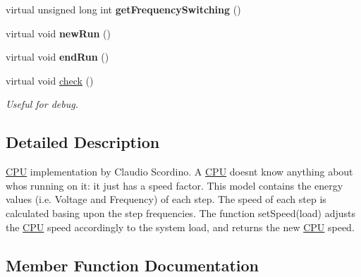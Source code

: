 \begin{DoxyCompactItemize}
\item 
virtual unsigned long int {\bfseries get\+Frequency\+Switching} ()\hypertarget{classRTSim_1_1CPU_a783104c122067f0a14127e64bbaf0a58}{}\label{classRTSim_1_1CPU_a783104c122067f0a14127e64bbaf0a58}

\item 
virtual void {\bfseries new\+Run} ()\hypertarget{classRTSim_1_1CPU_a478cf472c9d9b5cd8daf12e1b0a09893}{}\label{classRTSim_1_1CPU_a478cf472c9d9b5cd8daf12e1b0a09893}

\item 
virtual void {\bfseries end\+Run} ()\hypertarget{classRTSim_1_1CPU_a53b0e66fc9c8b288a31b1c4eab5e28ed}{}\label{classRTSim_1_1CPU_a53b0e66fc9c8b288a31b1c4eab5e28ed}

\item 
virtual void \hyperlink{classRTSim_1_1CPU_a4b80bedc04b5162e7788dd4003aa5175}{check} ()\hypertarget{classRTSim_1_1CPU_a4b80bedc04b5162e7788dd4003aa5175}{}\label{classRTSim_1_1CPU_a4b80bedc04b5162e7788dd4003aa5175}

\begin{DoxyCompactList}\small\item\em Useful for debug. \end{DoxyCompactList}\end{DoxyCompactItemize}


\subsection{Detailed Description}
\hyperlink{classRTSim_1_1CPU}{C\+PU} implementation by Claudio Scordino. A \hyperlink{classRTSim_1_1CPU}{C\+PU} doesn\textquotesingle{}t know anything about who\textquotesingle{}s running on it\+: it just has a speed factor. This model contains the energy values (i.\+e. Voltage and Frequency) of each step. The speed of each step is calculated basing upon the step frequencies. The function set\+Speed(load) adjusts the \hyperlink{classRTSim_1_1CPU}{C\+PU} speed accordingly to the system load, and returns the new \hyperlink{classRTSim_1_1CPU}{C\+PU} speed. 

\subsection{Member Function Documentation}
